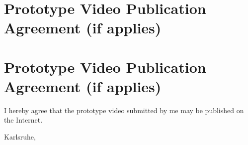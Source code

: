 
{\chapter{Prototype Video Publication Agreement (if applies)}}
{\chapter{Prototype Video Publication Agreement (if applies)}}
\label{ch:Declaration}

I hereby agree that the prototype video submitted by me may be published on the Internet.

\vspace*{1cm}
\hspace*{4cm} Karlsruhe, \submissiontime \hspace*{0.5cm}\hrulefill \\
\hspace*{10.5cm} \myname \\

